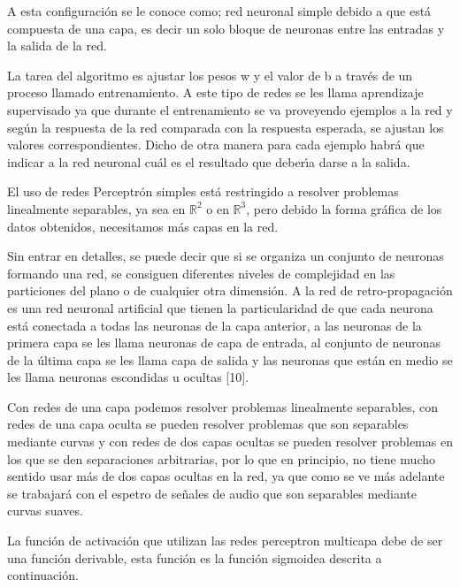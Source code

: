 A esta configuraci\'{o}n se le conoce como; red neuronal simple debido a que
est\'{a} compuesta de una capa, es decir un solo bloque de neuronas entre las
entradas y la salida de la red.

La tarea del algoritmo es ajustar los pesos w y el valor de b a trav\'{e}s de
un proceso llamado entrenamiento. A este tipo de redes se les llama
aprendizaje supervisado ya que durante el entrenamiento se va proveyendo
ejemplos a la red y seg\'{u}n la respuesta de la red comparada con la
respuesta esperada, se ajustan los valores correspondientes. Dicho de otra
manera para cada ejemplo habr\'{a} que indicar a la red neuronal cu\'{a}l es
el resultado que deber\'{\i}a darse a la salida.

El uso de redes Perceptr\'{o}n simples est\'{a} restringido a resolver
problemas linealmente separables, ya sea en $%
\mathbb{R}
^{2}$ o en $%
\mathbb{R}
^{3}$, pero debido la forma gr\'{a}fica de los datos obtenidos, necesitamos
m\'{a}s capas en la red.

Sin entrar en detalles, se puede decir que si se organiza un conjunto de
neuronas formando una red, se consiguen diferentes niveles de complejidad en
las particiones del plano o de cualquier otra dimensi\'{o}n. A la red de
retro-propagaci\'{o}n es una red neuronal artificial que tienen la
particularidad de que cada neurona est\'{a} conectada a todas las neuronas de
la capa anterior, a las neuronas de la primera capa se les llama neuronas de
capa de entrada, al conjunto de neuronas de la \'{u}ltima capa se les llama
capa de salida y las neuronas que est\'{a}n en medio se les llama neuronas
escondidas u ocultas [10].

Con redes de una capa podemos resolver problemas linealmente separables, con
redes de una capa oculta se pueden resolver problemas que son separables
mediante curvas y con redes de dos capas ocultas se pueden resolver problemas
en los que se den separaciones arbitrarias, por lo que en principio, no tiene
mucho sentido usar m\'{a}s de dos capas ocultas en la red, ya que como se ve
m\'{a}s adelante se trabajar\'{a} con el espetro de se\~{n}ales de audio que
son separables mediante curvas suaves.

La funci\'{o}n de activaci\'{o}n que utilizan las redes perceptron multicapa
debe de ser una funci\'{o}n derivable, esta funci\'{o}n es la funci\'{o}n
sigmoidea descrita a continuaci\'{o}n.$\qquad\qquad\qquad\qquad\qquad\qquad$

